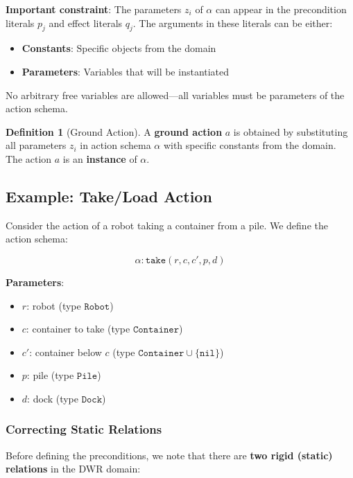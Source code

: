 \documentclass[11pt,a4paper]{article}
\theoremstyle{definition}
\newtheorem{definition}{Definition}[section]
\theoremstyle{plain}
\theoremstyle{remark}
\begin{document}
\textbf{Important constraint}: The parameters $z_i$ of $\alpha$ can appear in the precondition literals $p_j$ and effect literals $q_j$. The arguments in these literals can be either:
\begin{itemize}
    \item \textbf{Constants}: Specific objects from the domain
    \item \textbf{Parameters}: Variables that will be instantiated
\end{itemize}

No arbitrary free variables are allowed—all variables must be parameters of the action schema.

\begin{tcolorbox}[colback=green!5!white,colframe=green!75!black,title=\textbf{Ground Action}]
\begin{definition}[Ground Action]
A \textbf{ground action} $a$ is obtained by substituting all parameters $z_i$ in action schema $\alpha$ with specific constants from the domain. The action $a$ is an \textbf{instance} of $\alpha$.
\end{definition}
\end{tcolorbox}

\subsection{Example: Take/Load Action}

Consider the action of a robot taking a container from a pile. We define the action schema:

\[
\alpha: \texttt{take}(r, c, c', p, d)
\]

\textbf{Parameters}:
\begin{itemize}
    \item $r$: robot (type $\texttt{Robot}$)
    \item $c$: container to take (type $\texttt{Container}$)
    \item $c'$: container below $c$ (type $\texttt{Container} \cup \{\texttt{nil}\}$)
    \item $p$: pile (type $\texttt{Pile}$)
    \item $d$: dock (type $\texttt{Dock}$)
\end{itemize}

\subsubsection{Correcting Static Relations}

Before defining the preconditions, we note that there are \textbf{two rigid (static) relations} in the DWR domain:
\end{document}
